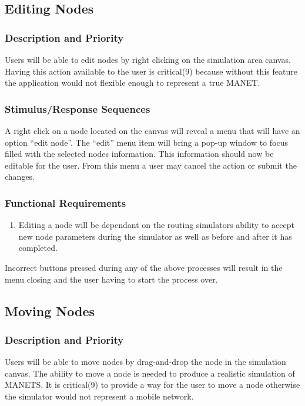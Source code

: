 \documentclass[a4paper,11pt,titlepage]{article}
\begin{document}
\subsection{Editing Nodes}

\subsubsection{Description and Priority}
Users will be able to edit nodes by right clicking on the simulation area canvas.
Having this action available to the user is critical(9) because without this feature the
application would not flexible enough to represent a true MANET.

\subsubsection{Stimulus/Response Sequences}
A right click on a node located on the canvas will reveal a menu that will have an
option “edit node”. The “edit” menu item will bring a pop-up window to focus filled with
the selected nodes information. This information should now be editable for the user.
From this menu a user may cancel the action or submit the changes.

\subsubsection{Functional Requirements}
\begin{enumerate}[{\bf {REQ} 1}]
  \item Editing a node will be dependant on the routing simulators ability to accept
  new node parameters during the simulator as well as before and after it has
  completed.
\end{enumerate}

\begin{description}[\breaklabel] 
  \item[Errors] Incorrect buttons pressed during any of the above processes will result in the
menu closing and the user having to start the process over.
\end{description}

\subsection{Moving Nodes}
\subsubsection{Description and Priority}
Users will be able to move nodes by drag-and-drop the node in the simulation canvas.
The ability to move a node is needed to produce a realistic simulation of MANETS.
It is critical(9) to provide a way for the user to move a node otherwise the simulator
would not represent a mobile network.
\end{document}
